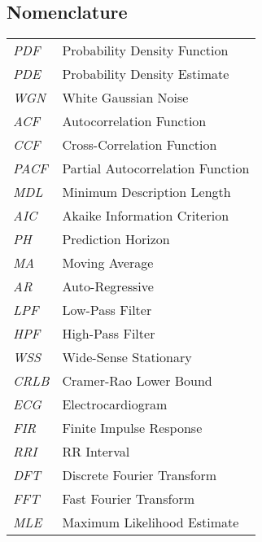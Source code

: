 
\begin{flushleft}

\section{Nomenclature}


\begin{table}[H]
\begin{tabular}{l l }
\textit{PDF}  & Probability Density Function
 \\[6pt] 
 \textit{PDE}  & Probability Density Estimate
 \\[6pt] 
\textit{WGN}  & White Gaussian Noise
 \\[6pt] 
\textit{ACF}  & Autocorrelation Function
 \\[6pt] 
 \textit{CCF}  & Cross-Correlation Function
 \\[6pt] 
\textit{PACF}  & Partial Autocorrelation Function
 \\[6pt] 
 \textit{MDL}  & Minimum Description Length
 \\[6pt] 
 \textit{AIC}  & Akaike Information Criterion
 \\[6pt] 
\textit{PH}  & Prediction Horizon
 \\[6pt] 
\textit{MA}  & Moving Average
 \\[6pt] 
\textit{AR}  & Auto-Regressive
 \\[6pt] 
 \textit{LPF}  & Low-Pass Filter
 \\[6pt] 
 \textit{HPF}  & High-Pass Filter
 \\[6pt] 
 \textit{WSS}  & Wide-Sense Stationary
 \\[6pt] 
 \textit{CRLB}  & Cramer-Rao Lower Bound
 \\[6pt] 
 \textit{ECG}  & Electrocardiogram
 \\[6pt] 
  \textit{FIR}  & Finite Impulse Response
 \\[6pt] 
\textit{RRI}  & RR Interval
 \\[6pt] 
\textit{DFT}  & Discrete Fourier Transform
 \\[6pt] 
\textit{FFT}  & Fast Fourier Transform
 \\[6pt] 
\textit{MLE}  & Maximum Likelihood Estimate
 \\[6pt] 
\end{tabular}
\label{Tab:nomen}
\end{table}

\end{flushleft}